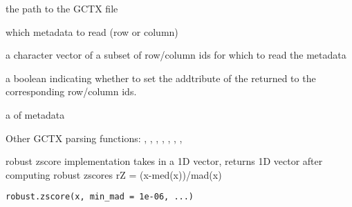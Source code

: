 \documentclass[letterpaper]{book}
\begin{document}
%
\begin{Arguments}
\begin{ldescription}
\item[\code{gctx\_path}] the path to the GCTX file

\item[\code{dimension}] which metadata to read (row or column)

\item[\code{ids}] a character vector of a subset of row/column ids
for which to read the metadata

\item[\code{set\_annot\_rownames}] a boolean indicating whether to set the 
 addtribute of the returned  to
the corresponding row/column ids.
\end{ldescription}
\end{Arguments}
%
\begin{Value}
a  of metadata
\end{Value}
%
\begin{SeeAlso}\relax
Other GCTX parsing functions: ,
, ,
, ,
, ,
\end{SeeAlso}
%
\begin{Examples}
\end{Examples}
%
\begin{Description}\relax
robust zscore implementation
takes in a 1D vector, returns 1D vector
after computing robust zscores
rZ = (x-med(x))/mad(x)
\end{Description}
%
\begin{Usage}
\begin{verbatim}
robust.zscore(x, min_mad = 1e-06, ...)
\end{verbatim}
\end{Usage}
\end{document}
